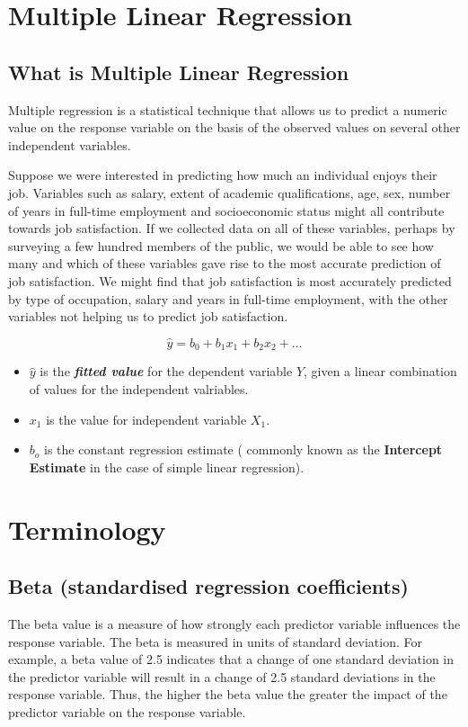 \documentclass[a4paper,12pt]{article}
\begin{document}
\section{Multiple Linear Regression}
\subsection{What is Multiple Linear Regression}

Multiple regression is a statistical technique that allows us to predict a numeric value on the response variable on the basis of the observed values on several other independent variables.

Suppose we were interested in predicting how much an individual enjoys their job. Variables such as salary, extent of academic qualifications, age, sex, number of years in full-time employment and socioeconomic status might all contribute towards job satisfaction. If we collected data on all of these variables, perhaps by surveying a few hundred members of the public, we would be able to see how many and which of these variables gave rise to the most accurate prediction of job satisfaction. We might find that job satisfaction is most accurately predicted by type of occupation, salary and years in full-time employment, with the other variables not helping us to predict job satisfaction.

\[\hat{y} = b_0 + b_1x_1 + b_2x_2 + \ldots \]

\begin{itemize}
\item $\hat{y}$ is the \textbf{\textit{fitted value}} for the dependent variable \textbf{$Y$}, given a linear combination of values for the independent valriables.

\item $x_1$ is the value for independent variable \textbf{$X_1$}.
\item $b_o$ is the constant regression estimate ( commonly known as the \textbf{Intercept Estimate} in the case of simple linear regression).
\end{itemize}
\newpage
\section{Terminology}
\subsection{Beta (standardised regression coefficients)}
The beta value is a measure of how strongly each predictor variable influences the
response variable. The beta is measured in units of standard deviation. For example,
a beta value of 2.5 indicates that a change of one standard deviation in the predictor
variable will result in a change of 2.5 standard deviations in the response variable.
Thus, the higher the beta value the greater the impact of the predictor variable on
the response variable.
\end{document}
